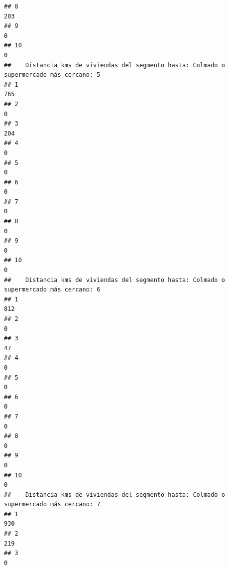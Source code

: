 \documentclass[11pt,]{article}
\begin{document}
\begin{verbatim}
## 8                                                                                   203
## 9                                                                                     0
## 10                                                                                    0
##    Distancia kms de viviendas del segmento hasta: Colmado o supermercado más cercano: 5
## 1                                                                                   765
## 2                                                                                     0
## 3                                                                                   204
## 4                                                                                     0
## 5                                                                                     0
## 6                                                                                     0
## 7                                                                                     0
## 8                                                                                     0
## 9                                                                                     0
## 10                                                                                    0
##    Distancia kms de viviendas del segmento hasta: Colmado o supermercado más cercano: 6
## 1                                                                                   812
## 2                                                                                     0
## 3                                                                                    47
## 4                                                                                     0
## 5                                                                                     0
## 6                                                                                     0
## 7                                                                                     0
## 8                                                                                     0
## 9                                                                                     0
## 10                                                                                    0
##    Distancia kms de viviendas del segmento hasta: Colmado o supermercado más cercano: 7
## 1                                                                                   930
## 2                                                                                   219
## 3                                                                                     0

\end{verbatim}
\end{document}
